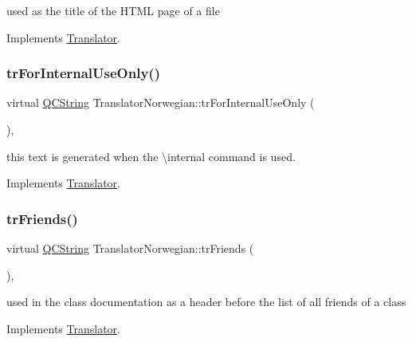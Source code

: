 used as the title of the H\+T\+ML page of a file 

Implements \mbox{\hyperlink{class_translator}{Translator}}.

\mbox{\label{class_translator_norwegian_ae24456df4b45e2bd59c72676a8540dd9}} 
\subsubsection{\texorpdfstring{trForInternalUseOnly()}{trForInternalUseOnly()}}
{\footnotesize\ttfamily virtual \mbox{\hyperlink{class_q_c_string}{Q\+C\+String}} Translator\+Norwegian\+::tr\+For\+Internal\+Use\+Only (\begin{DoxyParamCaption}{ }\end{DoxyParamCaption})\hspace{0.3cm}{\ttfamily [inline]}, {\ttfamily [virtual]}}

this text is generated when the \textbackslash{}internal command is used. 

Implements \mbox{\hyperlink{class_translator}{Translator}}.

\mbox{\label{class_translator_norwegian_a96f8017637d4f6ea626b0cfcbedff4f1}} 
\subsubsection{\texorpdfstring{trFriends()}{trFriends()}}
{\footnotesize\ttfamily virtual \mbox{\hyperlink{class_q_c_string}{Q\+C\+String}} Translator\+Norwegian\+::tr\+Friends (\begin{DoxyParamCaption}{ }\end{DoxyParamCaption})\hspace{0.3cm}{\ttfamily [inline]}, {\ttfamily [virtual]}}

used in the class documentation as a header before the list of all friends of a class 

Implements \mbox{\hyperlink{class_translator}{Translator}}.

\mbox{\label{class_translator_norwegian_a5de6dadf1f0aa1b2b520f42555b87aad}} 
